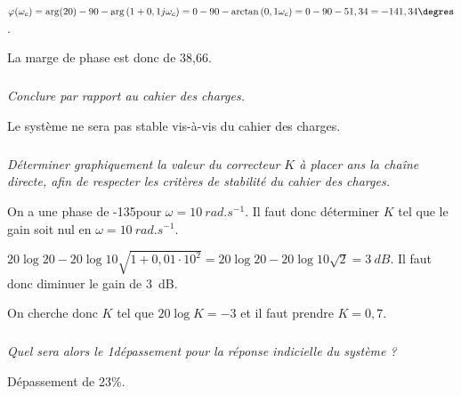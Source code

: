 \documentclass[10pt,fleqn]{article} %
\begin{document}
\begin{multicols}{2}
\begin{corrige}
$\varphi(\omega_c)=\arg(20)-90 -\arg\left(1+0,1j\omega_c \right)
=0- 90 -\arctan\left( 0,1\omega_c \right)
=0-90-51,34=-141,34\degres$.

La marge de phase est donc de 38,66\degres.
\end{corrige}
\else
\fi

\subparagraph{}\textit{Conclure par rapport au cahier des charges.}
\ifprof
\begin{corrige}
Le système ne sera pas stable vis-à-vis du cahier des charges.
\end{corrige}
\else
\fi

\subparagraph{}\textit{Déterminer graphiquement la valeur du correcteur $K$ à placer ans la chaîne directe, afin de respecter les critères de stabilité du cahier des charges.}
\ifprof
\begin{corrige}
On a une phase de -135\degres pour $\omega=\SI{10}{rad.s^{-1}}$. Il faut donc déterminer $K$ tel que le gain soit nul en $\omega=\SI{10}{rad.s^{-1}}$.

$20\log 20 - 20\log 10\sqrt{1+0,01\cdot 10^2}=20\log 20 - 20\log 10\sqrt{2}=\SI{3}{dB}$. Il faut donc diminuer le gain de \SI{3}{dB}.

On cherche donc $K$ tel que $20 \log K = -3$ et il faut prendre $K=0,7$.
\end{corrige}
\else
\fi

\subparagraph{}\textit{Quel sera alors le 1\ier dépassement pour la réponse indicielle du système ?}
\ifprof
\begin{corrige}
Dépassement de 23\%.
\end{corrige}
\else
\fi

\ifprof
\else
\end{multicols}
\fi
\end{document}
